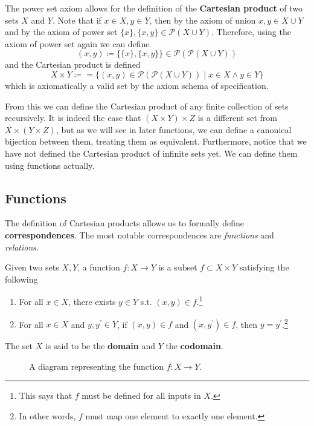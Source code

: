 \documentclass{article}
\begin{document}
    \begin{definition}
      The power set axiom allows for the definition of the \textbf{Cartesian product} of two sets $X$ and $Y$. Note that if $x \in X, y \in Y$, then by the axiom of union $x, y \in X \cup Y$ and by the axiom of power set $\{x\}, \{x, y\} \in \mathcal{P}(X \cup Y)$. Therefore, using the axiom of power set again we can define
      \begin{equation}
        (x, y) \coloneqq \{\{x\}, \{x, y\}\} \in \mathcal{P}(\mathcal{P}(X \cup Y))
      \end{equation} 
      and the Cartesian product is defined 
      \begin{equation}
        X \times Y \coloneqq = \{ (x, y) \in \mathcal{P}(\mathcal{P}(X \cup Y))  \mid x \in X \land y \in Y \}
      \end{equation}
      which is axiomatically a valid set by the axiom schema of specification. 
    \end{definition} 

    From this we can define the Cartesian product of any finite collection of sets recursively. It is indeed the case that $(X \times Y) \times Z$ is a different set from $X \times (Y \times Z)$, but as we will see in later functions, we can define a canonical bijection between them, treating them as equivalent. Furthermore, notice that we have not defined the Cartesian product of infinite sets yet. We can define them using functions actually. 

  \subsection{Functions} 

    The definition of Cartesian products allows us to formally define \textbf{correspondences}. The most notable correspondences are \textit{functions} and \textit{relations}. 

    \begin{definition}[Function]
      Given two sets $X, Y$, a function $f: X \rightarrow Y$ is a subset $f \subset X \times Y$ satisfying the following
      \begin{enumerate}
        \item For all $x \in X$, there exists $y \in Y$ s.t. $(x, y) \in f$.\footnote{This says that $f$ must be defined for all inputs in $X$.}
        \item For all $x \in X$ and $y, y^\prime \in Y$, if $(x, y) \in f$ and $(x, y^\prime) \in f$, then $y = y^\prime$.\footnote{In other words, $f$ must map one element to exactly one element.} 
      \end{enumerate}
      The set $X$ is said to be the \textbf{domain} and $Y$ the \textbf{codomain}. 

      \begin{figure}[H]
        \centering 
        \caption{A diagram representing the function $f: X \rightarrow Y$.} 
        \label{fig:function at}
      \end{figure}
    \end{definition}  
\end{document}
